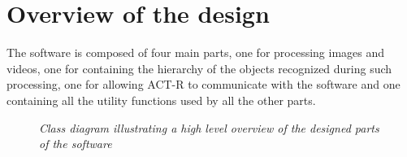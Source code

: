 	\section{Overview of the design}
	The software is composed of four main parts, one for processing images and videos, one for containing the hierarchy of the objects recognized during such processing, one for allowing ACT-R to communicate with the software and one containing all the utility functions used by all the other parts.

	\begin{figure}[h]
	  \begin{center} 
	  \end{center} 
	  \caption{\textit{Class diagram illustrating a high level overview of the designed parts of the software}}  
	  \label{fig:swArchitecture}
 	\end{figure}		

